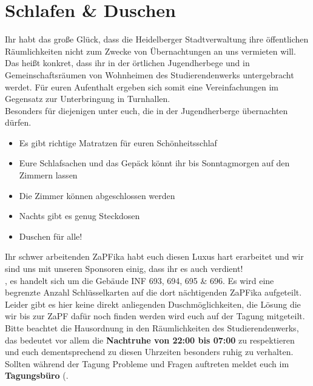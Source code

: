 
\section{Schlafen \& Duschen}
Ihr habt das große Glück, dass die Heidelberger Stadtverwaltung ihre öffentlichen Räumlichkeiten nicht zum Zwecke von Übernachtungen an uns vermieten will. Das heißt konkret, dass ihr in der örtlichen Jugendherbege und in Gemeinschaftsräumen von Wohnheimen des Studierendenwerks untergebracht werdet. Für euren Aufenthalt ergeben sich somit eine Vereinfachungen im Gegensatz zur Unterbringung in Turnhallen.\\
Besonders für diejenigen unter euch, die in der Jugendherberge übernachten dürfen.
\begin{itemize}
  \item Es gibt richtige Matratzen für euren Schönheitsschlaf
  \item Eure Schlafsachen und das Gepäck könnt ihr bis Sonntagmorgen auf den Zimmern lassen
  \item Die Zimmer können abgeschlossen werden
  \item Nachts gibt es genug Steckdosen
  \item Duschen für alle!
\end{itemize}
Ihr schwer arbeitenden ZaPFika habt euch diesen Luxus hart erarbeitet und wir sind uns mit unseren Sponsoren einig, dass ihr es auch verdient! \\
\todo[inline{Eventuell noch seriöse Details zur Unterbrinung (Räumen der Zimmer, Zimmeraufteilung etc.) eintragen}

\subsection{Unterbringung in den Gemeinschaftsräumen}
Vierzig von euch haben die Ehre in den sogenannten Notunterkünften des Studierendenwerks unterzukommen, die uns dankenswerterweise zur Verfügung gestellt werden. 
Ihr sollt jedoch keine Not erleiden, ganz im Gegenteil, in einem Raum dürfen sich jeweils zehn Personen das Glück teilen. Wo die Gebäude sind findet ihr auf dem \todo[inline]{der Plan halt}, es handelt sich um die Gebäude INF 693, 694, 695 \& 696. Es wird eine begrenzte Anzahl Schlüsselkarten auf die dort nächtigenden ZaPFika aufgeteilt. Leider gibt es hier keine direkt anliegenden Duschmöglichkeiten, die Lösung die wir bis zur ZaPF dafür noch finden werden wird euch auf der Tagung mitgeteilt.
Bitte beachtet die Hausordnung in den Räumlichkeiten des Studierendenwerks, das bedeutet vor allem die \textbf{Nachtruhe von 22:00 bis 07:00} zu respektieren und euch dementsprechend zu diesen Uhrzeiten besonders ruhig zu verhalten.\\
Sollten während der Tagung Probleme und Fragen auftreten meldet euch im \textbf{Tagungsbüro} (.

